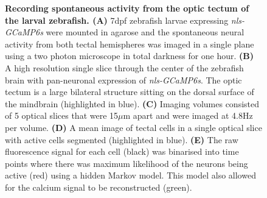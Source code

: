 \begin{figure}[!ht]
        \caption[\label{fig:R1_F1} \textbf{Recording spontaneous activity from the optic tectum of the larval zebrafish.}]{\label{fig:R1_F1} \textbf{Recording spontaneous activity from the optic tectum of the larval zebrafish. (A)} 7\gls{dpf}	 zebrafish	 larvae	 expressing	 \emph{nls-GCaMP6s}	 were	 mounted	 in agarose	 and	 the spontaneous	neural	activity from	both	tectal	hemispheres	was imaged in a	single	plane using	a	 two	photon	microscope	in	 total	darkness	 for	one	hour. \textbf{(B)} A high resolution single slice through the center of the zebrafish brain with pan-neuronal expression of \emph{nls-GCaMP6s}. The optic tectum is a large bilateral structure sitting on the dorsal surface of the mindbrain (highlighted in blue).  \textbf{(C)} Imaging volumes consisted of 5 optical slices that were 15$\mu$m apart and were imaged at 4.8Hz per volume. \textbf{(D)} A mean image of tectal cells in a single optical slice with active cells segmented (highlighted in blue). \textbf{(E)}  The raw fluorescence signal for each cell (black) was binarised into time points where there was maximum likelihood of the neurons being active (red) using a hidden Markov model. This model also allowed for the calcium signal to be reconstructed (green). }
      \end{figure}
    
